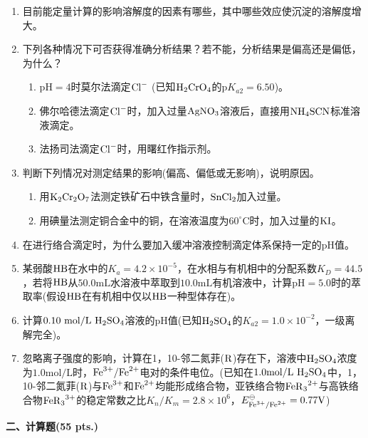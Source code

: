 \begin{enumerate}[label=\arabic*., itemsep=1.5ex]
    \item 目前能定量计算的影响溶解度的因素有哪些，其中哪些效应使沉淀的溶解度增大。
    \item 下列各种情况下可否获得准确分析结果？若不能，分析结果是偏高还是偏低，为什么？
    \begin{enumerate}[label=\alph*), noitemsep, topsep=0pt, partopsep=0pt]
        \item $\mathrm{pH}=4$时莫尔法滴定$\ce{Cl^-}$ (已知$\ce{H2CrO4}$的$\mathrm{p}K_{a2}=6.50$)。
        \item 佛尔哈德法滴定$\ce{Cl^-}$时，加入过量$\ce{AgNO3}$溶液后，直接用$\ce{NH4SCN}$标准溶液滴定。
        \item 法扬司法滴定$\ce{Cl^-}$时，用曙红作指示剂。
    \end{enumerate}
    \item 判断下列情况对测定结果的影响(偏高、偏低或无影响)，说明原因。
    \begin{enumerate}[label=\alph*), noitemsep, topsep=0pt, partopsep=0pt]
        \item 用$\ce{K2Cr2O7}$法测定铁矿石中铁含量时，$\ce{SnCl2}$加入过量。
        \item 用碘量法测定铜合金中的铜，在溶液温度为$60^\circ\mathrm{C}$时，加入过量的$\ce{KI}$。
    \end{enumerate}
    \item 在进行络合滴定时，为什么要加入缓冲溶液控制滴定体系保持一定的$\mathrm{pH}$值。
    \item 某弱酸$\ce{HB}$在水中的$K_a=4.2\times10^{-5}$，在水相与有机相中的分配系数$K_D=44.5$，若将$\ce{HB}$从$50.0\mathrm{mL}$水溶液中萃取到$10.0\mathrm{mL}$有机溶液中，计算$\mathrm{pH}=5.0$时的萃取率(假设$\ce{HB}$在有机相中仅以$\ce{HB}$一种型体存在)。
    \item 计算$0.10\ \mathrm{mol/L}\ \ce{H2SO4}$溶液的$\mathrm{pH}$值(已知$\ce{H2SO4}$的$K_{a2}=1.0\times10^{-2}$，一级离解完全)。
    \item 忽略离子强度的影响，计算在1，10-邻二氮菲($\ce{R}$)存在下，溶液中$\ce{H2SO4}$浓度为$1.0\mathrm{mol/L}$时，$\ce{Fe^{3+}/Fe^{2+}}$电对的条件电位。(已知在$1.0\mathrm{mol/L}\ \ce{H2SO4}$中，1，10-邻二氮菲($\ce{R}$)与$\ce{Fe^{3+}}$和$\ce{Fe^{2+}}$均能形成络合物，亚铁络合物$\ce{FeR_3^{2+}}$与高铁络合物$\ce{FeR_3^{3+}}$的稳定常数之比$K_n/K_m=2.8\times10^6$，$E^\ominus_{\ce{Fe^{3+}/Fe^{2+}}}=0.77\mathrm{V}$)
\end{enumerate}

\vspace{0.5cm}
\noindent\textbf{二、计算题(55 pts.)}

